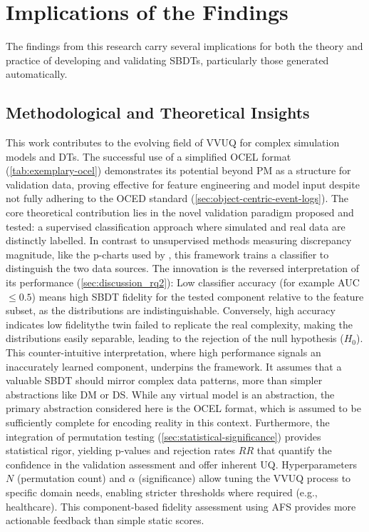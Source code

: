 \section{Implications of the Findings}
\label{sec:discussion_implications}

The findings from this research carry several implications for both the theory and practice of developing and validating SBDTs, particularly those generated automatically.

\subsection{Methodological and Theoretical Insights}
\label{sec:implications_theoretical}

This work contributes to the evolving field of VVUQ for complex simulation models and DTs. The successful use of a simplified OCEL format (\autoref{tab:exemplary-ocel}) demonstrates its potential beyond PM as a structure for validation data, proving effective for feature engineering and model input despite not fully adhering to the OCED standard (\autoref{sec:object-centric-event-logs}). The core theoretical contribution lies in the novel validation paradigm proposed and tested: a supervised classification approach where simulated and real data are distinctly labelled. In contrast to unsupervised methods measuring discrepancy magnitude, like the p-charts used by \autocite{dos2024simulation}, this framework trains a classifier to distinguish the two data sources. The innovation is the reversed interpretation of its performance (\autoref{sec:discussion_rq2}): Low classifier accuracy (for example AUC $\le 0.5$) means high SBDT fidelity for the tested component relative to the feature subset, as the distributions are indistinguishable. Conversely, high accuracy indicates low fidelity\textemdash the twin failed to replicate the real complexity, making the distributions easily separable, leading to the rejection of the null hypothesis ($H_0$). This counter-intuitive interpretation, where high performance signals an inaccurately learned component, underpins the framework. It assumes that a valuable SBDT should mirror complex data patterns, more than simpler abstractions like DM or DS. While any virtual model is an abstraction, the primary abstraction considered here is the OCEL format, which is assumed to be sufficiently complete for encoding reality in this context. Furthermore, the integration of permutation testing (\autoref{sec:statistical-significance}) provides statistical rigor, yielding p-values and rejection rates $RR$ that quantify the confidence in the validation assessment and offer inherent UQ. Hyperparameters $N$ (permutation count) and $\alpha$ (significance) allow tuning the VVUQ process to specific domain needs, enabling stricter thresholds where required (e.g., healthcare). This component-based fidelity assessment using AFS provides more actionable feedback than simple static scores.

